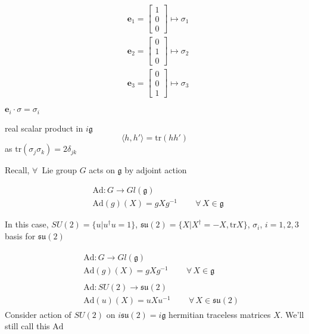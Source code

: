 \[
\begin{aligned}
  & \mathbf{e}_1 = \left[ \begin{matrix} 1 \\ 0 \\ 0 \end{matrix} \right] \mapsto \sigma_1 \\ 
  & \mathbf{e}_2 = \left[ \begin{matrix} 0 \\ 1 \\ 0 \end{matrix} \right] \mapsto \sigma_2 \\ 
  & \mathbf{e}_3 = \left[ \begin{matrix} 0 \\ 0 \\ 1 \end{matrix} \right] \mapsto \sigma_3 
\end{aligned}
\]

$\mathbf{e}_i \cdot \sigma = \sigma_i$

real scalar product in $i\mathfrak{g}$ 
\[
\langle h, h' \rangle = \text{tr}(hh')
\]
as $\text{tr}{ (\sigma_j \sigma_k)} = 2\delta_{jk}$

Recall, $\forall \, $ Lie group $G$ acts on $\mathfrak{g}$ by adjoint action

\[
\begin{aligned}
  & \text{Ad}: G \to Gl(\mathfrak{g}) \\ 
  & \text{Ad}(g)(X) = gXg^{-1} \quad \quad \, \forall \, X \in \mathfrak{g}
\end{aligned}
\]

In this case, $SU(2) = \lbrace u | u^{\dag} u =1 \rbrace$, $\mathfrak{su}(2) = \lbrace X | X^{\dag} = -X, \text{tr}X \rbrace$, $\sigma_i$, $i=1,2,3$ basis for $\mathfrak{su}(2)$

\[
\begin{aligned}
  & \begin{aligned}
  & \text{Ad}: G \to Gl(\mathfrak{g}) \\ 
  & \text{Ad}(g)(X) = gXg^{-1} \quad \quad \, \forall \, X \in \mathfrak{g}
\end{aligned} \\
& \begin{aligned}
  & \text{Ad}: SU(2) \to \mathfrak{su}(2)  \\ 
  & \text{Ad}(u)(X) = uXu^{-1} \quad \quad \, \forall \, X \in \mathfrak{su}(2)
\end{aligned}
\end{aligned}
\]
Consider action of $SU(2)$ on $i\mathfrak{su}(2) = i\mathfrak{g}$ hermitian traceless matrices $X$. We'll still call this $\text{Ad}$

